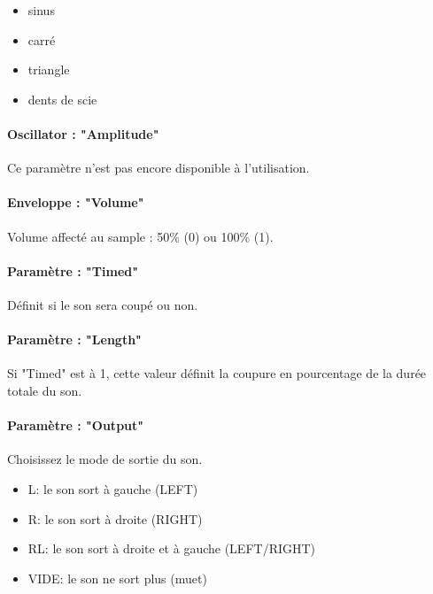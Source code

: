 \begin{itemize}
    \item{ sinus}
    \item{ carré}
    \item{ triangle}
    \item{ dents de scie}
\end{itemize}\medskip

\paragraph{Oscillator : "Amplitude"} Ce paramètre n'est pas encore disponible à l'utilisation.

\paragraph{Enveloppe : "Volume"} Volume affecté au sample : 50\% (0) ou 100\% (1).

\paragraph{Paramètre : "Timed"} Définit si le son sera coupé ou non.

\paragraph{Paramètre : "Length"} Si "Timed" est à 1, cette valeur définit la coupure en pourcentage de la durée totale du son.

\paragraph{Paramètre : "Output"} Choisissez le mode de sortie du son.
\medskip

\begin{itemize}
    \item{L: le son sort à gauche (LEFT)}
    \item{R: le son sort à droite (RIGHT)}
    \item{RL: le son sort à droite et à gauche (LEFT/RIGHT)}
    \item{VIDE: le son ne sort plus (muet)}
\end{itemize}
